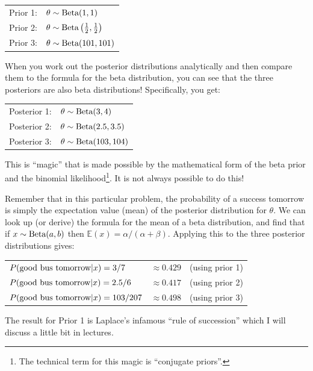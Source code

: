 \begin{table}[ht!]\begin{center}
\begin{tabular}{ll}
Prior 1: & $\theta \sim \textnormal{Beta}(1, 1)$\\
Prior 2: & $\theta \sim \textnormal{Beta}\left(\frac{1}{2}, \frac{1}{2}\right)$\\
Prior 3: & $\theta \sim \textnormal{Beta}(101, 101)$\\
\end{tabular}\end{center}
\end{table}

When you work out the posterior distributions analytically and then compare them
to the formula for the beta distribution, you can see that the three posteriors
are also beta distributions! Specifically, you get:
\begin{table}[ht!]\begin{center}
\begin{tabular}{ll}
Posterior 1: & $\theta \sim \textnormal{Beta}(3, 4)$\\
Posterior 2: & $\theta \sim \textnormal{Beta}(2.5, 3.5)$\\
Posterior 3: & $\theta \sim \textnormal{Beta}(103, 104)$
\end{tabular}\end{center}
\end{table}
This is ``magic'' that is made possible by the mathematical form of the beta
prior and the binomial likelihood\footnote{The technical term for this magic is ``conjugate priors''.}.
It is not always possible to do this!

Remember that in this particular problem, the probability of a success tomorrow
is simply the expectation value (mean) of the posterior distribution for $\theta$.
We can look up (or derive) the formula for the mean of a beta distribution, and find that
if $x \sim \textnormal{Beta}(a, b)$ then $\mathds{E}(x) = \alpha/(\alpha + \beta)$.
Applying this to the three posterior distributions gives:

\begin{table}[ht!]\begin{center}
\begin{tabular}{lll}
$P(\textnormal{good bus tomorrow}|x) = 3/7 $    & $\approx 0.429$ & (using prior 1)\\
$P(\textnormal{good bus tomorrow}|x) = 2.5/6$   & $\approx 0.417$ & (using prior 2)\\
$P(\textnormal{good bus tomorrow}|x) = 103/207$ & $\approx 0.498$ & (using prior 3)
\end{tabular}\end{center}
\end{table}
The result for Prior 1 is Laplace's infamous ``rule of succession'' which I will
discuss a little bit in lectures.

